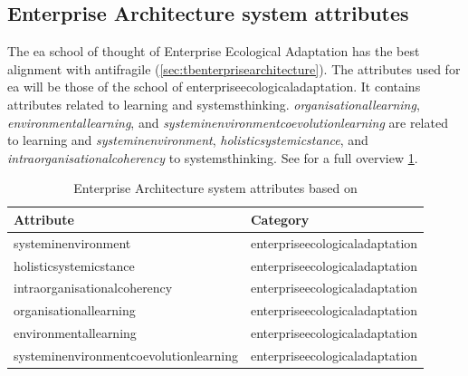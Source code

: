 \subsection{Enterprise Architecture system attributes}
\label{sub:attributesonea}
The \gls{ea} school of thought of Enterprise Ecological Adaptation has the best alignment with \gls{antifragile} (\cref{sec:tbenterprisearchitecture}). The \glspl{attribute} used for \gls{ea} will be those of the school of \gls{enterpriseecologicaladaptation}.  It contains \glspl{attribute} related to learning and \gls{systemsthinking}. \textit{\Gls{organisationallearning}}, \textit{\gls{environmentallearning}}, and \textit{\gls{systeminenvironmentcoevolutionlearning}} are related to learning and \textit{\gls{systeminenvironment}}, \textit{\gls{holisticsystemicstance}}, and \textit{\gls{intraorganisationalcoherency}} to \gls{systemsthinking}. See for a full overview \cref{tab:attributesofeea}.
\begin{longtable}{@{}p{}p{}@{}}
	\toprule%
	\textbf{Attribute} & \textbf{Category} \\%
	\midrule%
	\endhead%
	\hline
	\endfoot%
	\caption[Enterprise Architecture system attributes based on \parencite{Lapalme2012}]{Enterprise Architecture system attributes based on \parencite{Lapalme2012}}
	\label{tab:attributesofeea}
	\endlastfoot%
	\Gls{systeminenvironment} & \Gls{enterpriseecologicaladaptation} \\%
	\Gls{holisticsystemicstance} & \Gls{enterpriseecologicaladaptation} \\%
	\Gls{intraorganisationalcoherency} & \Gls{enterpriseecologicaladaptation} \\%
	\Gls{organisationallearning} & \Gls{enterpriseecologicaladaptation} \\%
	\Gls{environmentallearning} & \Gls{enterpriseecologicaladaptation} \\%
	\Gls{systeminenvironmentcoevolutionlearning} & \Gls{enterpriseecologicaladaptation} \\%
	\bottomrule%
\end{longtable}